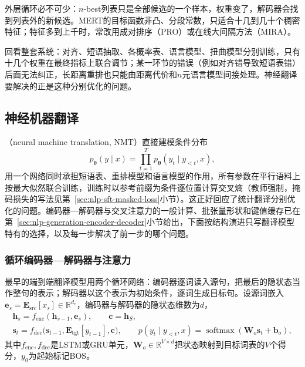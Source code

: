 外层循环必不可少：$n$-best列表只是全部候选的一个样本，权重变了，解码器会找到列表外的新候选。MERT的目标函数非凸、分段常数，只适合十几到几十个稠密特征；特征多到上千时，常改用成对排序（PRO）或在线大间隔方法（MIRA）。

回看整套系统：对齐、短语抽取、各概率表、语言模型、扭曲模型分别训练，只有十几个权重在最终指标上联合调节；某一环节的错误（例如对齐错导致短语表错）后面无法纠正，长距离重排也只能由距离代价和$n$元语言模型间接处理。神经翻译要解决的正是这种分别优化的问题。

\subsection{神经机器翻译}
\label{sec:nlp-generation-neural-translation}

（neural machine translation, NMT）直接建模条件分布
\begin{equation}
  p_{\bm\theta}(y\mid x)=\prod_{t=1}^{T}p_{\bm\theta}(y_t\mid y_{<t},x),
  \label{eq:nlp-generation-nmt}
\end{equation}
用一个网络同时承担短语表、重排模型和语言模型的作用，所有参数在平行语料上按最大似然联合训练，训练时以参考前缀为条件逐位置计算交叉熵（教师强制，掩码损失的写法见第~\ref{sec:nlp-sft-masked-loss}小节）。这正好回应了统计翻译分别优化的问题。编码器—解码器与交叉注意力的一般计算、批张量形状和键值缓存已在第~\ref{sec:nlp-generation-encoder-decoder}小节给出，下面按结构演进只写翻译模型特有的选择，以及每一步解决了前一步的哪个问题。

\subsubsection{循环编码器—解码器与注意力}
\label{sec:nlp-generation-rnn-attention-mt}

最早的端到端翻译模型用两个循环网络：编码器逐词读入源句，把最后的隐状态当作整句的表示；解码器以这个表示为初始条件，逐词生成目标句\cite{sutskever2014seq2seq,cho2014}。设源词嵌入$\bm e_s=\bm E_{\mathrm{src}}[x_s]\in\mathbb R^{d_e}$，编码器与解码器的隐状态维数为$d$，
\begin{equation}
  \begin{gathered}
  \bm h_s=f_{\mathrm{enc}}(\bm h_{s-1},\bm e_s),\qquad \bm c=\bm h_S,\\
  \bm s_t=f_{\mathrm{dec}}\bigl(\bm s_{t-1},\bm E_{\mathrm{tgt}}[y_{t-1}],\bm c\bigr),\qquad
  p(y_t\mid y_{<t},x)=\operatorname{softmax}(\bm W_o\bm s_t+\bm b_o),
  \end{gathered}
  \label{eq:nlp-generation-rnn-seq2seq}
\end{equation}
其中$f_{\mathrm{enc}},f_{\mathrm{dec}}$是LSTM或GRU单元，$\bm W_o\in\mathbb R^{V\times d}$把状态映射到目标词表的$V$个得分，$y_0$为起始标记BOS。

